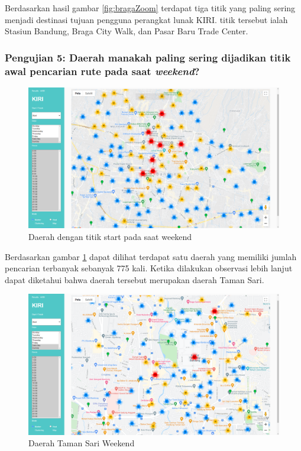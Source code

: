Berdasarkan hasil gambar \ref{fig:bragaZoom} terdapat tiga titik yang paling sering menjadi destinasi tujuan pengguna perangkat lunak KIRI. titik tersebut ialah Stasiun Bandung, Braga City Walk, dan Pasar Baru Trade Center.

\subsubsection{Pengujian 5: Daerah manakah paling sering dijadikan titik awal pencarian rute pada saat \textit{weekend}?}
\label{subsec:pengujian5}
\begin{figure}[H]
	\centering  
	\includegraphics[scale=0.3]{Gambar/pengujian/weekend-start.png}  
	\caption[Daerah dengan titik start pada saat weekend]{Daerah dengan titik start pada saat weekend } 
	\label{fig:weekendStart}
\end{figure}

Berdasarkan gambar \ref{fig:weekendStart} dapat dilihat terdapat satu daerah yang memiliki jumlah pencarian terbanyak sebanyak 775 kali. Ketika dilakukan observasi lebih lanjut dapat diketahui bahwa daerah tersebut merupakan daerah Taman Sari.

\begin{figure}[H]
	\centering  
	\includegraphics[scale=0.3]{Gambar/pengujian/weekend-taman-sari-zoomed.png}  
	\caption[Daerah Taman Sari Weekend ]{Daerah Taman Sari Weekend } 
	\label{fig:weekendStartZoom}
\end{figure}

